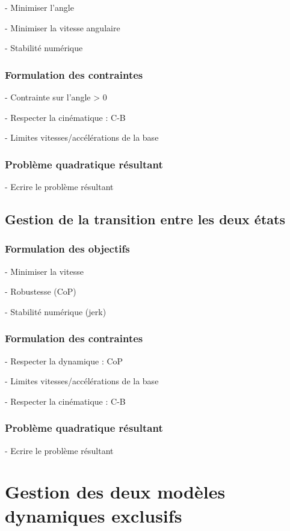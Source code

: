 				- Minimiser l'angle

				- Minimiser la vitesse angulaire

				- Stabilité numérique

			\subsubsection{Formulation des contraintes}

				- Contrainte sur l'angle > 0

				- Respecter la cinématique : C-B

				- Limites vitesses/accélérations de la base

			\subsubsection{Problème quadratique résultant}
		
				- Ecrire le problème résultant

		\subsection{Gestion de la transition entre les deux états}
			\subsubsection{Formulation des objectifs}

				- Minimiser la vitesse

				- Robustesse (CoP)

				- Stabilité numérique (jerk)

			\subsubsection{Formulation des contraintes}

				- Respecter la dynamique : CoP

				- Limites vitesses/accélérations de la base

				- Respecter la cinématique : C-B

			\subsubsection{Problème quadratique résultant}
		
				- Ecrire le problème résultant

	\section{Gestion des deux modèles dynamiques exclusifs}
		\label{section.superviseur}

